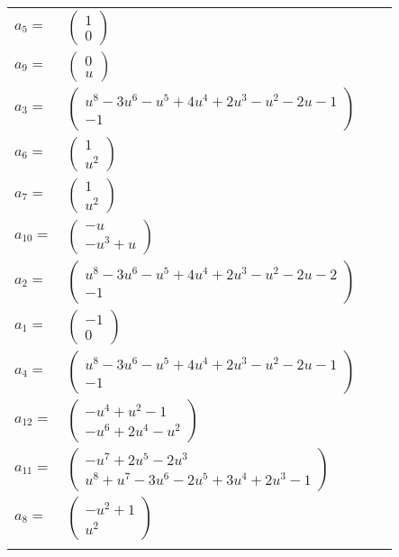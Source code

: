 \documentclass[1p]{elsarticle_modified}
\theoremstyle{definition}
\begin{document}
\begin{tabular}{m{7pt} m{180pt} m{7pt} m{180pt} }
\flushright $a_{5}=$&$\begin{pmatrix}1\\0\end{pmatrix}$ \\
\flushright $a_{9}=$&$\begin{pmatrix}0\\u\end{pmatrix}$ \\
\flushright $a_{3}=$&$\begin{pmatrix}u^8-3 u^6- u^5+4 u^4+2 u^3- u^2-2 u-1\\-1\end{pmatrix}$ \\
\flushright $a_{6}=$&$\begin{pmatrix}1\\u^2\end{pmatrix}$ \\
\flushright $a_{7}=$&$\begin{pmatrix}1\\u^2\end{pmatrix}$ \\
\flushright $a_{10}=$&$\begin{pmatrix}- u\\- u^3+u\end{pmatrix}$ \\
\flushright $a_{2}=$&$\begin{pmatrix}u^8-3 u^6- u^5+4 u^4+2 u^3- u^2-2 u-2\\-1\end{pmatrix}$ \\
\flushright $a_{1}=$&$\begin{pmatrix}-1\\0\end{pmatrix}$ \\
\flushright $a_{4}=$&$\begin{pmatrix}u^8-3 u^6- u^5+4 u^4+2 u^3- u^2-2 u-1\\-1\end{pmatrix}$ \\
\flushright $a_{12}=$&$\begin{pmatrix}- u^4+u^2-1\\- u^6+2 u^4- u^2\end{pmatrix}$ \\
\flushright $a_{11}=$&$\begin{pmatrix}- u^7+2 u^5-2 u^3\\u^8+u^7-3 u^6-2 u^5+3 u^4+2 u^3-1\end{pmatrix}$ \\
\flushright $a_{8}=$&$\begin{pmatrix}- u^2+1\\u^2\end{pmatrix}$\\&\end{tabular}
\end{document}
